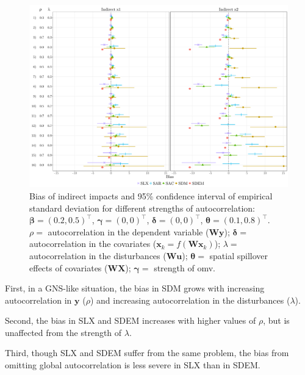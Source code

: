 \documentclass[
  letterpaper,
]{scrbook}
\begin{document}
\begin{figure}

{\centering \includegraphics{fig/sim11_combined_1.png}

}

\caption{Bias of indirect impacts and 95\% confidence interval of
empirical standard deviation for different strengths of autocorrelation:
\({\boldsymbol{\mathbf{\beta}}}=(0.2, 0.5)^\intercal\),
\({\boldsymbol{\mathbf{\gamma}}}=(0, 0)^\intercal\),
\({\boldsymbol{\mathbf{\delta}}}=(0, 0)^\intercal\),
\({\boldsymbol{\mathbf{\theta}}}=(0.1, 0.8)^\intercal\). \(\rho=\)
autocorrelation in the dependent variable
(\(\boldsymbol{\mathbf{W}} \boldsymbol{\mathbf{y}}\));
\(\boldsymbol{\mathbf{\delta}}=\) autocorrelation in the covariates
(\(\boldsymbol{\mathbf{x}}_k = f(\boldsymbol{\mathbf{W}} \boldsymbol{\mathbf{x}}_k)\));
\(\lambda=\) autocorrelation in the disturbances
(\(\boldsymbol{\mathbf{W}} \boldsymbol{\mathbf{u}}\));
\(\boldsymbol{\mathbf{\theta}}=\) spatial spillover effects of
covariates (\(\boldsymbol{\mathbf{W}} \boldsymbol{\mathbf{X}}\));
\(\boldsymbol{\mathbf{\gamma}}=\) strength of omv.}

\end{figure}

First, in a GNS-like situation, the bias in SDM grows with increasing
autocorrelation in \({\boldsymbol{\mathbf{y}}}\) (\(\rho\)) and
increasing autocorrelation in the disturbances (\(\lambda\)).

Second, the bias in SLX and SDEM increases with higher values of
\(\rho\), but is unaffected from the strength of \(\lambda\).

Third, though SLX and SDEM suffer from the same problem, the bias from
omitting global autocorrelation is less severe in SLX than in SDEM.
\end{document}

